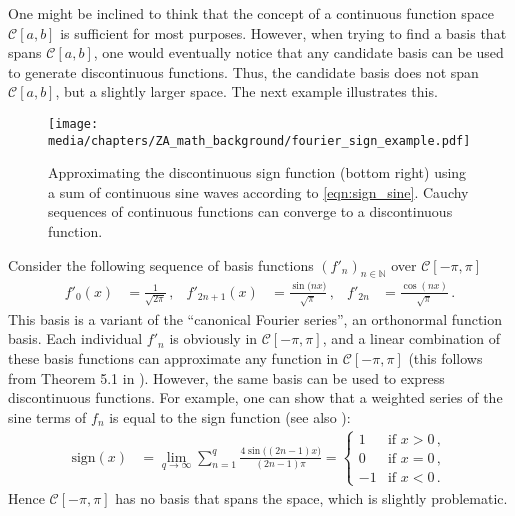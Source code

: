 One might be inclined to think that the concept of a continuous function space $\mathcal{C}[a, b]$ is sufficient for most purposes. However, when trying to find a basis that spans $\mathcal{C}[a, b]$, one would eventually notice that any candidate basis can be used to generate discontinuous functions. Thus, the candidate basis does not span $\mathcal{C}[a, b]$, but a slightly larger space.
The next example illustrates this.

\begin{figure}[t]
\centering
\texttt{[image: media/chapters/ZA\_math\_background/fourier\_sign\_example.pdf]}
 	\caption[Approximating the discontinuous sign function using continuous functions]{Approximating the discontinuous sign function (bottom right) using a sum of continuous sine waves according to \cref{eqn:sign_sine}.
 	Cauchy sequences of continuous functions can converge to a discontinuous function.}
 	\label{fig:fourier_sign_example}
\end{figure}

\begin{example}
Consider the following sequence of basis functions $(f'_n)_{n \in \mathbb{N}}$ over $\mathcal{C}[-\pi, \pi]$
\begin{align}
 	f'_0(x) &= \frac{1}{\sqrt{2\pi}} \,,&
 	f'_{2n + 1}(x) &= \frac{\sin\big(nx\big)}{\sqrt{\pi}} \,, &
 	f'_{2n} &= \frac{\cos(nx)}{\sqrt{\pi}} \,.
 	\label{eqn:fourier_series_pi}
\end{align}
This basis is a variant of the \enquote{canonical Fourier series}, an orthonormal function basis.
Each individual $f'_n$ is obviously in $\mathcal{C}[-\pi, \pi]$, and a linear combination of these basis functions can approximate any function in $\mathcal{C}[-\pi, \pi]$ (this follows from Theorem 5.1 in \cite{young1988introduction}).
However, the same basis can be used to express discontinuous functions.
For example, one can show that a weighted series of the sine terms of $f_n$ is equal to the sign function (see also ):
\begin{align}
 	\mathrm{sign}(x) &= \lim_{q \to \infty}\sum_{n = 1}^q \frac{4 \sin\big((2n - 1)x\big)}{(2n - 1) \pi} = \begin{cases}
 		1 & \text{if } x > 0 \,,\\
 		0 & \text{if } x = 0 \,,\\
 		-1 & \text{if } x < 0 \,.
 	\end{cases}
 	\label{eqn:sign_sine}
\end{align}
Hence $\mathcal{C}[-\pi, \pi]$ has no basis that spans the space, which is slightly problematic.
\end{example}

